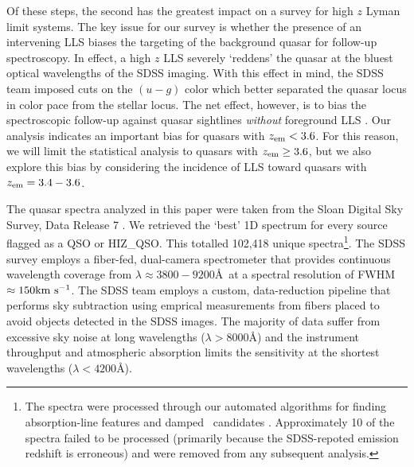 \documentclass[12pt,preprint]{aastex}
\begin{document}
Of these steps, the second has the greatest 
impact on a survey for high $z$ Lyman limit systems. 
The key issue for our survey is whether the presence 
of an intervening LLS biases the targeting of the
background quasar for follow-up spectroscopy.  
In effect, a high $z$ LLS severely `reddens' the quasar
at the bluest optical wavelengths of the SDSS imaging.  
With this effect in mind, the SDSS team imposed cuts
on the $(u-g)$ color which better separated the quasar
locus in color pace from the stellar locus.  The net effect,
however, is to bias the spectroscopic follow-up against 
quasar sightlines {\it without} foreground LLS
\citep[][hereafter PWO09]{pwo09}.  Our analysis indicates
an important bias for quasars with $z_{\rm em} < 3.6$. 
For this reason, we will limit the statistical analysis
to quasars with $z_{\rm em} \ge 3.6$, but we also explore this bias
by considering the incidence of LLS toward quasars with $z_{\rm em} = 3.4 - 3.6$.


The quasar spectra analyzed in this paper were taken from the Sloan
Digital Sky Survey, Data Release 7 \citep{sdssdr7}.  
We retrieved
the `best' 1D spectrum for every source flagged as a QSO or HIZ\_QSO.
This totalled 102,418 unique spectra\footnote{  
The spectra were processed through our automated algorithms for
finding absorption-line features and damped \lya\ candidates
\citep{phw05,shf06}.  
Approximately 10 of the spectra failed 
to be processed (primarily because the SDSS-repoted emission redshift
is erroneous) and were removed from any subsequent analysis.}.
The SDSS survey employs a 
fiber-fed, dual-camera spectrometer that provides continuous wavelength coverage
from $\lambda \approx 3800-9200$\AA\ at a spectral resolution of 
FWHM~$\approx 150 {\rm km~s^{-1}}$.
The SDSS team employs a custom, data-reduction pipeline that performs
sky subtraction using emprical measurements from fibers placed
to avoid objects detected in the SDSS images.
The majority of data suffer from excessive sky noise at long
wavelengths ($\lambda > 8000$\AA)
and the instrument throughput and atmospheric absorption
limits the sensitivity at the shortest wavelengths ($\lambda < 4200$\AA).
\end{document}

